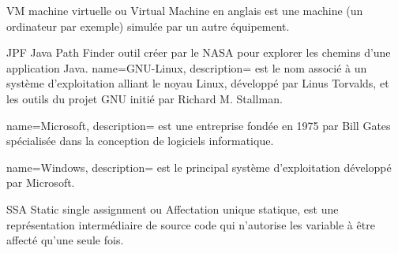 


    {VM}
    {machine virtuelle}
    { ou Virtual Machine en anglais est une machine (un ordinateur par exemple) simulée par un autre équipement.}
    
    {JPF}
    {Java Path Finder}
    { outil créer par le NASA pour explorer les chemins d'une application Java.}
{
        name=GNU-Linux,
        description={ est le nom associé à un système d'exploitation alliant le noyau Linux, développé par Linus Torvalds, et les outils du projet GNU initié par Richard M. Stallman.}
}

{
        name=Microsoft,
        description={ est une entreprise fondée en 1975 par Bill Gates spécialisée dans la conception de logiciels informatique.}
}

{
        name=Windows,
        description={ est le principal système d'exploitation développé par Microsoft.}
}


	{SSA}
	{Static single assignment}
	{ ou Affectation unique statique, est une représentation intermédiaire de source code qui n'autorise les variable à être affecté qu'une seule fois.}
